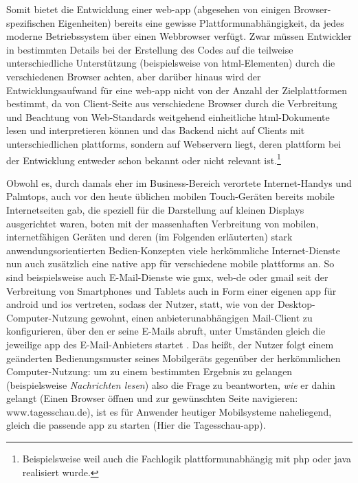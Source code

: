 Somit bietet die Entwicklung einer \gls{web-app} (abgesehen von einigen Browser-spezifischen Eigenheiten) bereits eine gewisse Plattformunabhängigkeit, da jedes moderne Betriebssystem über einen Webbrowser verfügt. 
Zwar müssen Entwickler in bestimmten Details bei der Erstellung des Codes auf die teilweise unterschiedliche Unterstützung (beispielsweise von \gls{html}-Elementen) durch die verschiedenen Browser achten, aber darüber hinaus wird der Entwicklungsaufwand für eine \gls{web-app} nicht von der Anzahl der Zielplattformen bestimmt, da von Client-Seite aus verschiedene Browser durch die Verbreitung und Beachtung von Web-Standards weitgehend einheitliche \gls{html}-Dokumente lesen und interpretieren können und das Back\-end nicht auf Clients mit unterschiedlichen \glspl{plattform}, sondern auf Webservern liegt, deren \gls{plattform} bei der Entwicklung entweder schon bekannt oder nicht relevant ist.\footnote{Beispielsweise weil auch die Fachlogik plattformunabhängig mit \gls*{php} oder \gls*{java} realisiert wurde.}

Obwohl es, durch damals eher im Business-Bereich verortete Internet-Handys und Palmtops, auch vor den heute üblichen mobilen Touch-Geräten bereits mobile Internetseiten gab, die speziell für die Darstellung auf kleinen Displays ausgerichtet waren, boten mit der massenhaften Verbreitung von mobilen, internetfähigen Geräten und deren (im Folgenden erläuterten) stark anwendungsorientierten Bedien-Konzepten viele herkömmliche Internet-Dienste nun auch zusätzlich eine native \gls{app} für verschiedene mobile \glspl{plattform} an.
So sind beispielsweise auch E-Mail-Dienste wie \gls{gmx}, \gls{web-de} oder \gls{gmail} seit der Verbreitung von Smartphones und Tablets auch in Form einer eigenen \gls{app} für \gls{android} und \gls{ios} vertreten, sodass der Nutzer, statt, wie von der Desktop-Computer-Nutzung gewohnt, einen anbieterunabhängigen Mail-Client zu konfigurieren, über den er seine E-Mails abruft, unter Umständen gleich die jeweilige \gls{app} des E-Mail-Anbieters startet \cite{gmx, web.de, gmail}.
Das heißt, der Nutzer folgt einem geänderten Bedienungsmuster seines Mobilgeräts gegenüber der herkömmlichen Computer-Nutzung: um zu einem bestimmten Ergebnis zu gelangen (beispielsweise \emph{Nachrichten lesen}) also die Frage zu beantworten, \emph{wie} er dahin gelangt (Einen Browser öffnen und zur gewünschten Seite navigieren: www.tagesschau.de), ist es für Anwender heutiger Mobilsysteme naheliegend, gleich die passende \gls{app} zu starten (Hier \zB die Tagesschau-\gls{app}).

